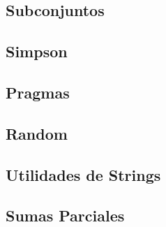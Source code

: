 \documentclass[a4paper,10pt,landscape,twocolumn]{article}
\begin{document}
\subsection{Subconjuntos}

\subsection{Simpson}

\subsection{Pragmas}

\subsection{Random}

\subsection{Utilidades de Strings}

\subsection{Sumas Parciales}


\newpage

\end{document}
